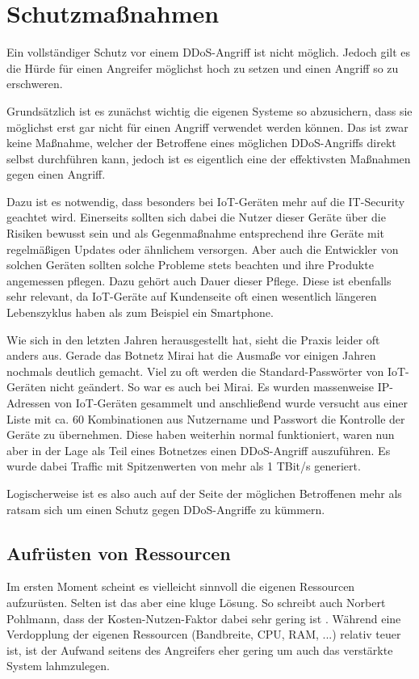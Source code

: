 \chapter{Schutzmaßnahmen}
\label{chap:kapitel3}
Ein vollständiger Schutz vor einem DDoS-Angriff ist nicht möglich. Jedoch gilt es die Hürde für einen Angreifer möglichst hoch zu setzen und einen Angriff so zu erschweren.

Grundsätzlich ist es zunächst wichtig die eigenen Systeme so abzusichern, dass sie möglichst erst gar nicht für einen Angriff verwendet werden können. Das ist zwar keine Maßnahme, welcher der Betroffene eines möglichen DDoS-Angriffs direkt selbst durchführen kann, jedoch ist es eigentlich eine der effektivsten Maßnahmen gegen einen Angriff.

Dazu ist es notwendig, dass besonders bei IoT-Geräten mehr auf die IT-Security geachtet wird. Einerseits sollten sich dabei die Nutzer dieser Geräte über die Risiken bewusst sein und als Gegenmaßnahme entsprechend ihre Geräte mit regelmäßigen Updates oder ähnlichem versorgen.
Aber auch die Entwickler von solchen Geräten sollten solche Probleme stets beachten und ihre Produkte angemessen pflegen. Dazu gehört auch Dauer dieser Pflege. Diese ist ebenfalls sehr relevant, da IoT-Geräte auf Kundenseite oft einen wesentlich längeren Lebenszyklus haben als zum Beispiel ein Smartphone.

Wie sich in den letzten Jahren herausgestellt hat, sieht die Praxis leider oft anders aus. Gerade das Botnetz \glqq Mirai\grqq{} hat die Ausmaße vor einigen Jahren nochmals deutlich gemacht. Viel zu oft werden die Standard-Passwörter von IoT-Geräten nicht geändert. So war es auch bei Mirai. Es wurden massenweise IP-Adressen von IoT-Geräten gesammelt und anschließend wurde versucht aus einer Liste mit ca. 60 Kombinationen aus Nutzername und Passwort die Kontrolle der Geräte zu übernehmen. Diese haben weiterhin normal funktioniert, waren nun aber in der Lage als Teil eines Botnetzes einen DDoS-Angriff auszuführen. Es wurde dabei Traffic mit Spitzenwerten von mehr als 1 TBit/s generiert. \cite{Mirai}

Logischerweise ist es also auch auf der Seite der möglichen Betroffenen mehr als ratsam sich um einen Schutz gegen DDoS-Angriffe zu kümmern.

\section{Aufrüsten von Ressourcen}
\label{sec:k3rsc}
Im ersten Moment scheint es vielleicht sinnvoll die eigenen Ressourcen aufzurüsten. Selten ist das aber eine kluge Lösung. So schreibt auch Norbert Pohlmann, dass der Kosten-Nutzen-Faktor dabei sehr gering ist \cite{Pohlmann2019}. Während eine Verdopplung der eigenen Ressourcen (Bandbreite, CPU, RAM, ...) relativ teuer ist, ist der Aufwand seitens des Angreifers eher gering um auch das verstärkte System lahmzulegen.

